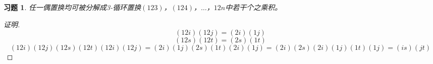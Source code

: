 \documentclass{article}
\begin{document}
\begin{CJK}{UTF8}{gbsn}
\newtheorem*{Ex}{习题}
  \begin{Ex}
  任一偶置换均可被分解成3-循环置换$(123)$，$(124)$，$\ldots$，$12n$中若干个之乘积。 
  \end{Ex}
  \begin{proof}[证明]
    \[(12i)(12j)=(2i)(1j)\]
    \[(12s)(12t)=(2s)(1t)\]
    \[(12i)(12j)(12s)(12t)(12i)(12j)=(2i)(1j)(2s)(1t)(2i)(1j)=(2i)(2s)(2i)(1j)(1t)(1j)=(is)(jt)\]
  \end{proof}
\end{CJK}
\end{document}

